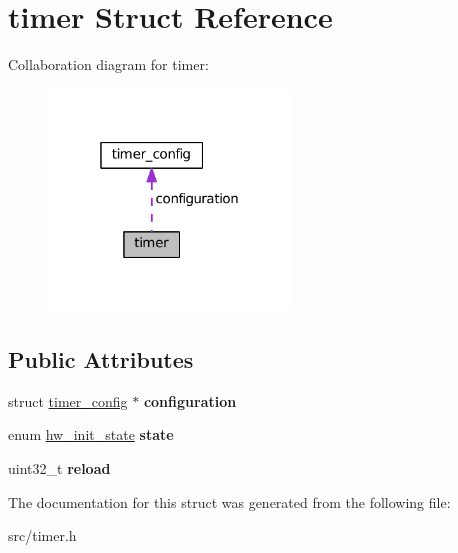 \hypertarget{structtimer}{}\section{timer Struct Reference}
\label{structtimer}


Collaboration diagram for timer\+:\nopagebreak
\begin{figure}[H]
\begin{center}
\leavevmode
\includegraphics[width=184pt]{structtimer__coll__graph}
\end{center}
\end{figure}
\subsection*{Public Attributes}
\begin{DoxyCompactItemize}
\item 
\hypertarget{structtimer_a2bef740a83dc4af81d0dd6ef45dfbbfd}{}struct \hyperlink{structtimer__config}{timer\+\_\+config} $\ast$ {\bfseries configuration}\label{structtimer_a2bef740a83dc4af81d0dd6ef45dfbbfd}

\item 
\hypertarget{structtimer_a98106a5170cdde683d8bafc2a07ee7cd}{}enum \hyperlink{hw_8h_a3c02952100e7d051b77cdf060ca0ba9b}{hw\+\_\+init\+\_\+state} {\bfseries state}\label{structtimer_a98106a5170cdde683d8bafc2a07ee7cd}

\item 
\hypertarget{structtimer_af0cf0d2403679e91e1dd266ad60e421c}{}uint32\+\_\+t {\bfseries reload}\label{structtimer_af0cf0d2403679e91e1dd266ad60e421c}

\end{DoxyCompactItemize}


The documentation for this struct was generated from the following file\+:\begin{DoxyCompactItemize}
\item 
src/timer.\+h\end{DoxyCompactItemize}
